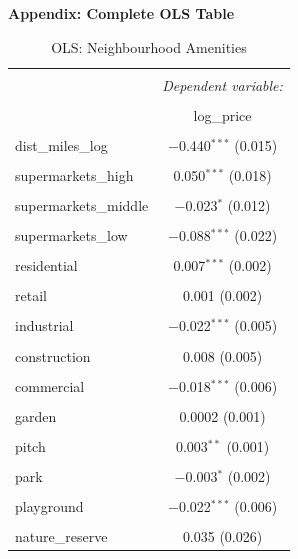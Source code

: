 \documentclass{article}
\begin{document}
\newpage
\textbf{Appendix: Complete OLS Table}
\begin{table}[H] \centering 
  \caption{OLS: Neighbourhood Amenities} 
  \label{table:complete} 
\small 
\begin{tabular}{@{\extracolsep{-10pt}}lc} 
\\[-1.8ex]\hline 
\hline \\[-1.8ex] 
 & \multicolumn{1}{c}{\textit{Dependent variable:}} \\ 
\cline{2-2} 
\\[-1.8ex] & log\_price \\ 
\hline \\[-1.8ex] 
 dist\_miles\_log & $-$0.440$^{***}$ (0.015) \\ 
  & \\ 
 supermarkets\_high & 0.050$^{***}$ (0.018) \\ 
  & \\ 
 supermarkets\_middle & $-$0.023$^{*}$ (0.012) \\ 
  & \\ 
 supermarkets\_low & $-$0.088$^{***}$ (0.022) \\ 
  & \\ 
 residential & 0.007$^{***}$ (0.002) \\ 
  & \\ 
 retail & 0.001 (0.002) \\ 
  & \\ 
 industrial & $-$0.022$^{***}$ (0.005) \\ 
  & \\ 
 construction & 0.008 (0.005) \\ 
  & \\ 
 commercial & $-$0.018$^{***}$ (0.006) \\ 
  & \\ 
 garden & 0.0002 (0.001) \\ 
  & \\ 
 pitch & 0.003$^{**}$ (0.001) \\ 
  & \\ 
 park & $-$0.003$^{*}$ (0.002) \\ 
  & \\ 
 playground & $-$0.022$^{***}$ (0.006) \\ 
  & \\ 
 nature\_reserve & 0.035 (0.026) \\ 

\end{tabular}
\end{table}
\end{document}
